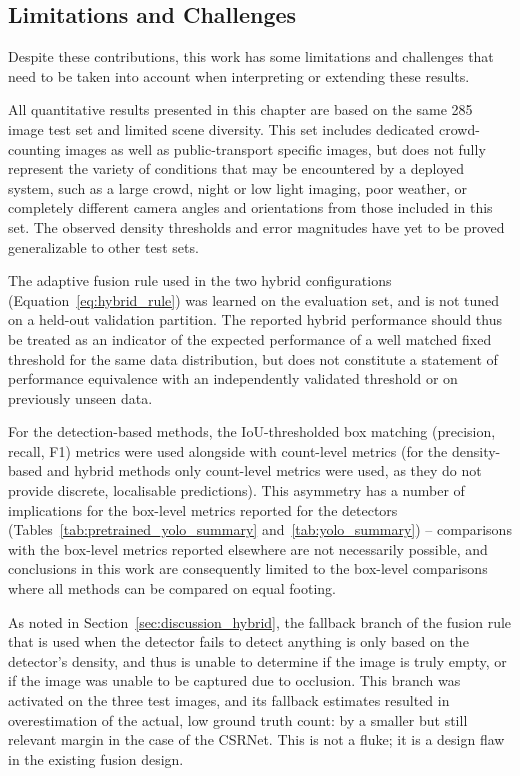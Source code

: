\subsection{Limitations and Challenges}
\label{sec:conclusion_limitations}

Despite these contributions, this work has some limitations and challenges that need to be taken into account when interpreting or extending these results.

All quantitative results presented in this chapter are based on the same 285 image test set and limited scene diversity. This set includes dedicated crowd-counting images as well as public-transport specific images, but does not fully represent the variety of conditions that may be encountered by a deployed system, such as a large crowd, night or low light imaging, poor weather, or completely different camera angles and orientations from those included in this set. The observed density thresholds and error magnitudes have yet to be proved generalizable to other test sets.

The adaptive fusion rule used in the two hybrid configurations (Equation~\ref{eq:hybrid_rule}) was learned on the evaluation set, and is not tuned on a held-out validation partition. The reported hybrid performance should thus be treated as an indicator of the expected performance of a well matched fixed threshold for the same data distribution, but does not constitute a statement of performance equivalence with an independently validated threshold or on previously unseen data.

For the detection-based methods, the IoU-thresholded box matching (precision, recall, F1) metrics were used alongside with count-level metrics (for the density-based and hybrid methods only count-level metrics were used, as they do not provide discrete, localisable predictions). This asymmetry has a number of implications for the box-level metrics reported for the detectors (Tables~\ref{tab:pretrained_yolo_summary} and~\ref{tab:yolo_summary}) – comparisons with the box-level metrics reported elsewhere are not necessarily possible, and conclusions in this work are consequently limited to the box-level comparisons where all methods can be compared on equal footing.

As noted in Section~\ref{sec:discussion_hybrid}, the fallback branch of the fusion rule that is used when the detector fails to detect anything is only based on the detector's density, and thus is unable to determine if the image is truly empty, or if the image was unable to be captured due to occlusion. This branch was activated on the three test images, and its fallback estimates resulted in overestimation of the actual, low ground truth count: by a smaller but still relevant margin in the case of the CSRNet. This is not a fluke; it is a design flaw in the existing fusion design.

